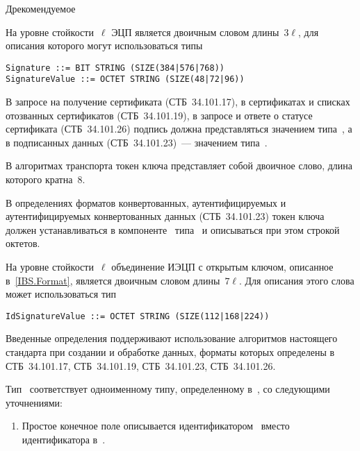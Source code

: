 \begin{appendix}{Д}{рекомендуемое}

\label{ASN.Sign}

На уровне стойкости~$\ell$ ЭЦП является двоичным словом длины~$3\ell$,
для описания которого могут использоваться типы
\begin{verbatim}
Signature ::= BIT STRING (SIZE(384|576|768))
SignatureValue ::= OCTET STRING (SIZE(48|72|96))
\end{verbatim}

В запросе на получение сертификата (СТБ~34.101.17),
в сертификатах и списках отозванных сертификатов (СТБ~34.101.19),
в запросе и ответе о статусе сертификата (СТБ~34.101.26)
подпись должна представляться значением типа~, 
а в подписанных данных (СТБ~34.101.23)~---
значением типа~.

\label{ASN.Token}

В алгоритмах транспорта 
токен ключа представляет собой двоичное слово, 
длина которого кратна~$8$.

В  определениях форматов конвертованных, аутентифицируемых 
и аутентифицируемых конвертованных данных (СТБ~34.101.23)
токен ключа должен устанавливаться 
в компоненте~ типа~
и описываться при этом строкой октетов.

\label{ASN.IBS}

На уровне стойкости~$\ell$ объединение ИЭЦП с открытым ключом,
описанное в~\ref{IBS.Format}, является двоичным словом длины~$7\ell$.
Для описания этого слова может использоваться тип
\begin{verbatim}
IdSignatureValue ::= OCTET STRING (SIZE(112|168|224))
\end{verbatim}

\label{ASN.Compat}

Введенные определения поддерживают использование алгоритмов 
настоящего стандарта при создании и обработке данных, 
форматы которых определены в СТБ~34.101.17, СТБ~34.101.19, 
СТБ~34.101.23, СТБ~34.101.26.

Тип~ соответствует одноименному типу,
определенному в~\cite{ANSI9.62}, со следующими уточнениями:
\begin{enumerate}
\item
Простое конечное поле описывается идентификатором~ 
вместо  идентификатора  в~\cite{ANSI9.62}.


\end{enumerate}
\end{appendix}
